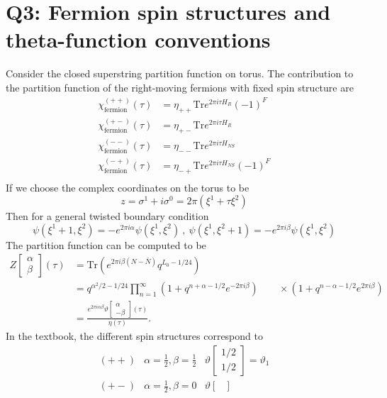 \documentclass[
  10pt,
  a4paper,
  openany]{book}
\begin{document}
\section{Q3: Fermion spin structures and theta-function
conventions}\label{q3-fermion-spin-structures-and-theta-function-conventions}

Consider the closed superstring partition function on torus. The
contribution to the partition function of the right-moving fermions with
fixed spin structure are \[
\begin{aligned}
\chi_{\text{fermion}}^{(++)}(\tau)&=\eta_{++}\mathrm{Tr}e^{2\pi i\tau H_{R}}(-1)^F\\
\chi_{\text{fermion}}^{(+-)}(\tau)&=\eta_{+ -}\mathrm{Tr}e^{2\pi i\tau H_{R}}\\
\chi_{\text{fermion}}^{(--)}(\tau)&=\eta_{--}\mathrm{Tr}e^{2\pi i\tau H_{NS}}\\
\chi_{\text{fermion}}^{(-+)}(\tau)&=\eta_{-+}\mathrm{Tr}e^{2\pi i\tau H_{NS}}(-1)^F\\
\end{aligned}
\] If we choose the complex coordinates on the torus to be \[
z=\sigma^1+i\sigma^0=2\pi(\xi^1+\tau \xi^2)
\] Then for a general twisted boundary condition \[
\psi(\xi^1+1,\xi^2)=-e^{2\pi i\alpha}\psi(\xi^1,\xi^2) \ , \ \psi(\xi^1,\xi^2+1)=-e^{2\pi i\beta}\psi(\xi^1,\xi^2)
\] The partition function can be computed to be \[
\begin{aligned}
Z\begin{bmatrix}\alpha\\\beta\end{bmatrix}(\tau)
&=\mathrm{Tr}(e^{2\pi i\beta(N-\bar N)}q^{L_0-1/24})\\
&=q^{\alpha^2/2-1/24}\prod_{n=1}^{\infty}(1+q^{n+\alpha-1/2}e^{-2\pi i\beta})
\qquad\times(1+q^{n-\alpha-1/2}e^{2\pi i\beta})\\
&=\frac{e^{2\pi i\alpha\beta}\vartheta\begin{bmatrix}\alpha\\-\beta\end{bmatrix}(\tau)}{\eta(\tau)}.
\end{aligned}
\] In the textbook, the different spin structures correspond to \[
\begin{array}{lll}
(++) & \alpha=\frac{1}{2},\beta=\frac{1}{2} & \vartheta \begin{bmatrix}
1/2 \\
1/2
\end{bmatrix}=\vartheta_{1} \\
(+ -) & \alpha=\frac{1}{2},\beta=0 & \vartheta \begin{bmatrix}

\end{bmatrix}
\end{array}\]
\end{document}

